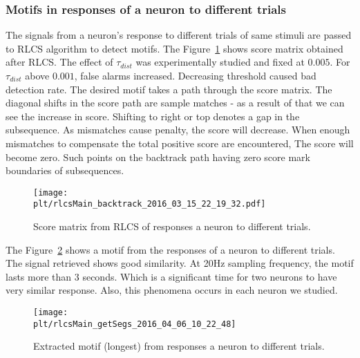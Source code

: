 \documentclass[MTech]{iitmdiss}
\newcommand{\plt}{thesis_plots}
\begin{document}
\subsubsection{Motifs in responses of a neuron to different trials} %
\label{ssub:motifs_in_responses_of_a_neuron_to_different_trials}
The signals from a neuron's response to different trials of same stimuli are passed to RLCS algorithm to detect motifs. The Figure~\ref{img:score_trial} shows score matrix obtained after RLCS. The effect of $\tau_{dist}$ was experimentally studied and fixed at $0.005$. For $\tau_{dist}$ above $0.001$, false alarms increased. Decreasing threshold caused bad detection rate. The desired motif takes a path through the score matrix. The diagonal shifts in the score path are sample matches - as a result of that we can see the increase in score. Shifting to right or top denotes a gap in the subsequence. As mismatches cause penalty, the score will decrease. When enough mismatches to compensate the total positive score are encountered, The score will become zero. Such points on the backtrack path having zero score mark boundaries of subsequences.
\begin{figure}[h]
    \centering
    \texttt{[image: \\plt/rlcsMain\_backtrack\_2016\_03\_15\_22\_19\_32.pdf]}
    \caption{Score matrix from RLCS of responses a neuron to different trials.}
    \label{img:score_trial}
\end{figure}

The Figure~\ref{img:motif_trial} shows a motif from the responses of a neuron to different trials. The signal retrieved shows good similarity. At 20Hz sampling frequency, the motif lasts more than $3$ seconds. Which is a significant time for two neurons to have very similar response. Also, this phenomena occurs in each neuron we studied.
\begin{figure}[h]
    \centering
    \texttt{[image: \\plt/rlcsMain\_getSegs\_2016\_04\_06\_10\_22\_48]}
    \caption{Extracted motif (longest) from responses a neuron to different trials.}
    \label{img:motif_trial}
\end{figure}
\end{document}
